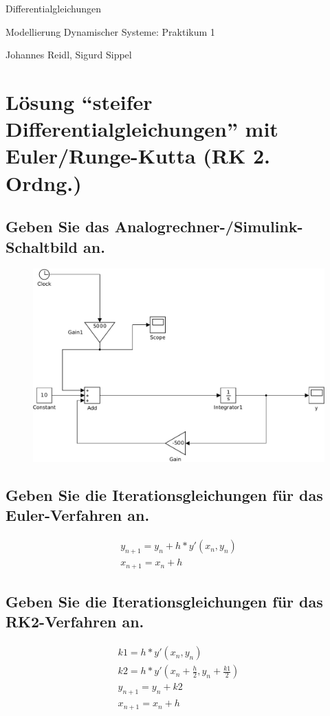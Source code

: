 \documentclass[10pt,a4paper]{article}
\begin{document}
\begin{center}
\begin{LARGE}
Differentialgleichungen
\end{LARGE}

Modellierung Dynamischer Systeme: Praktikum 1

Johannes Reidl, Sigurd Sippel

\end{center}

\section{Lösung  "`steifer Differentialgleichungen"' mit Euler/Runge-Kutta (RK 2. Ordng.)}

\subsection{Geben Sie das Analogrechner-/Simulink-Schaltbild an.}
\begin{figure}[H]
\centering
\includegraphics[width=0.9\linewidth]{../screenshots/1}
\end{figure}
\subsection{Geben Sie die Iterationsgleichungen für das Euler-Verfahren an.}
\begin{subequations}
\begin{align}
y_{n+1} = y_n + h * y'(x_n,y_n)\\
x_{n+1} = x_n + h
\end{align}
\end{subequations}

\subsection{Geben Sie die Iterationsgleichungen für das RK2-Verfahren an.}
\begin{subequations}
\begin{align}
k1 = h * y'(x_n,y_n)\\
k2 = h * y'(x_n + \frac{h}{2},y_n + \frac{k1}{2})\\
y_{n+1} = y_n + k2\\
x_{n+1} = x_n + h
\end{align}
\end{subequations}
\end{document}
